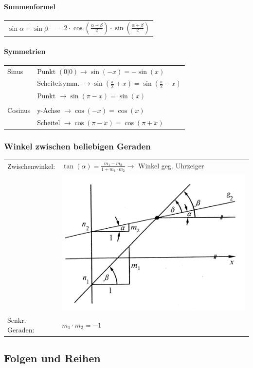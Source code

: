 			\paragraph{Summenformel}
				\begin{tabular}{ll}
					$\sin\alpha + \sin\beta$ & $= 2 \cdot \cos(\frac{\alpha - \beta}{2}) \cdot \sin(\frac{\alpha + \beta}{2})$ \\
				\end{tabular}
			
			\paragraph{Symmetrien} 
				\begin{tabular}{ll}
					Sinus & Punkt $(0|0) \rightarrow \sin(-x) = - \sin(x)$ \\
					      & Scheitelsymm. $\rightarrow \sin(\frac{\pi}{2} + x) = \sin(\frac{\pi}{2} - x)$ \\
					      & Punkt $\rightarrow \sin(\pi - x) = \sin(x)$ \\
					\\
					Cosinus & y-Achse $\rightarrow \cos(-x) = \cos(x)$ \\
					        & Scheitel $\rightarrow \cos(\pi - x) = \cos(\pi + x)$ \\		
				\end{tabular}
				
		\subsubsection{Winkel zwischen beliebigen Geraden}
			\begin{tabular}{ll}
				Zwischenwinkel: & $\tan(\alpha) = \frac{m_1 - m_2}{1 + m_1 \cdot m_2} \rightarrow$ Winkel geg. Uhrzeiger \\
				                & \includegraphics[width=0.3\linewidth]{Bilder/zwischenwinkel.png}\\
				Senkr. Geraden: & $m_1 \cdot m_2 = -1$ \\
			\end{tabular}
            
	\subsection{Folgen und Reihen}
			
